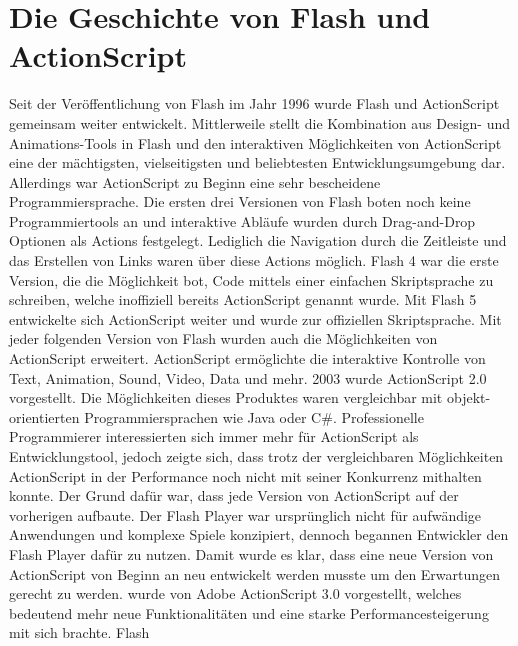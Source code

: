 \section{Die Geschichte von Flash und ActionScript}
Seit der Veröffentlichung von Flash im Jahr 1996 wurde Flash und ActionScript
gemeinsam weiter entwickelt. Mittlerweile stellt die Kombination aus Design-
und Animations-Tools in Flash und den interaktiven Möglichkeiten von
ActionScript eine der mächtigsten, vielseitigsten und beliebtesten
Entwicklungsumgebung dar. Allerdings war ActionScript zu Beginn eine sehr
bescheidene Programmiersprache.
\newline\newline
Die ersten drei Versionen von Flash boten noch keine Programmiertools an und
interaktive Abläufe wurden durch Drag-and-Drop Optionen als Actions festgelegt.
Lediglich die Navigation durch die Zeitleiste und das Erstellen von Links waren
über diese Actions möglich.
\newline\newline
Flash 4 war die erste Version, die die Möglichkeit bot, Code mittels einer
einfachen Skriptsprache zu schreiben, welche inoffiziell bereits ActionScript
genannt wurde. Mit Flash 5 entwickelte sich ActionScript weiter und wurde zur
offiziellen Skriptsprache. Mit jeder folgenden Version von Flash wurden auch
die Möglichkeiten von ActionScript erweitert. ActionScript ermöglichte die
interaktive Kontrolle von Text, Animation, Sound, Video, Data und mehr. 2003
wurde ActionScript 2.0 vorgestellt. Die Möglichkeiten dieses Produktes waren
vergleichbar mit objekt-orientierten Programmiersprachen wie Java oder C\#.
\newline\newline
Professionelle Programmierer interessierten sich immer mehr für ActionScript
als Entwicklungstool, jedoch zeigte sich, dass trotz der vergleichbaren
Möglichkeiten ActionScript in der Performance noch nicht mit seiner Konkurrenz
mithalten konnte. Der Grund dafür war, dass jede Version von ActionScript auf
der vorherigen aufbaute. Der Flash Player war ursprünglich nicht für
aufwändige Anwendungen und komplexe Spiele konzipiert, dennoch begannen
Entwickler den Flash Player dafür zu nutzen. Damit wurde es klar, dass eine
neue Version von ActionScript von Beginn an neu entwickelt werden musste um
den Erwartungen gerecht zu werden.
\newline{} wurde von Adobe ActionScript 3.0 vorgestellt, welches bedeutend mehr neue
Funktionalitäten und eine starke Performancesteigerung mit sich brachte. Flash
